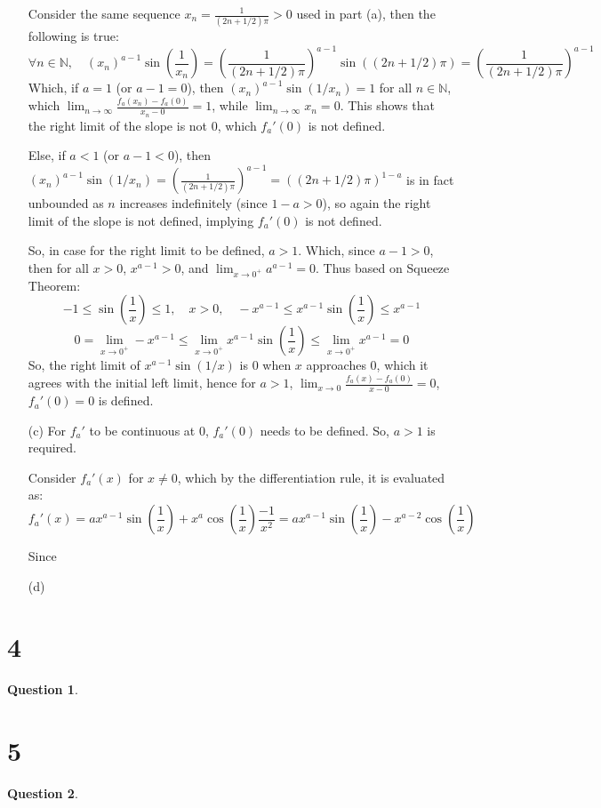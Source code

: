 \documentclass{article}
\newtheorem{question}{Question}
\begin{document}
\begin{itemize}
    Consider the same sequence $x_n = \frac{1}{(2n+1/2)\pi}>0$ used in part (a), then the following is true:
    $$\forall n\in\mathbb{N},\quad (x_n)^{a-1}\sin\left(\frac{1}{x_n}\right) = \left(\frac{1}{(2n+1/2)\pi}\right)^{a-1}\sin((2n+1/2)\pi) = \left(\frac{1}{(2n+1/2)\pi}\right)^{a-1}$$
    Which, if $a=1$ (or $a-1=0$), then $(x_n)^{a-1}\sin(1/x_n) = 1$ for all $n\in\mathbb{N}$, which $\lim_{n\rightarrow\infty}\frac{f_a(x_n)-f_a(0)}{x_n-0} = 1$, while $\lim_{n\rightarrow\infty}x_n=0$. 
    This shows that the right limit of the slope is not $0$, which $f_a'(0)$ is not defined.

    Else, if $a<1$ (or $a-1<0$), then $(x_n)^{a-1}\sin(1/x_n) = \left(\frac{1}{(2n+1/2)\pi}\right)^{a-1}= ((2n+1/2)\pi)^{1-a}$ is in fact unbounded as $n$ increases indefinitely (since $1-a>0$), 
    so again the right limit of the slope is not defined, implying $f_a'(0)$ is not defined.

    \hfill

    So, in case for the right limit to be defined, $a>1$. Which, since $a-1>0$, then for all $x>0$, $x^{a-1}>0$, and $\lim_{x\rightarrow 0^+}a^{a-1}=0$. Thus based on Squeeze Theorem:
    $$-1\leq \sin\left(\frac{1}{x}\right)\leq 1,\quad x>0,\quad -x^{a-1}\leq x^{a-1}\sin\left(\frac{1}{x}\right)\leq x^{a-1}$$
    $$0=\lim_{x\rightarrow0^+}-x^{a-1} \leq \lim_{x\rightarrow0^+}x^{a-1}\sin\left(\frac{1}{x}\right) \leq \lim_{x\rightarrow0^+}x^{a-1}=0$$
    So, the right limit of $x^{a-1}\sin(1/x)$ is $0$ when $x$ approaches $0$, which it agrees with the initial left limit,
    hence for $a>1$, $\lim_{x\rightarrow 0}\frac{f_a(x)-f_a(0)}{x-0} = 0$, $f_a'(0)=0$ is defined.

    \hfill

    \item[(c)] For $f_a'$ to be continuous at $0$, $f_a'(0)$ needs to be defined. So, $a>1$ is required.
    
    Consider $f_a'(x)$ for $x\neq 0$, which by the differentiation rule, it is evaluated as:
    $$f_a'(x)=ax^{a-1}\sin\left(\frac{1}{x}\right) + x^a\cos\left(\frac{1}{x}\right)\frac{-1}{x^2} = ax^{a-1}\sin\left(\frac{1}{x}\right) - x^{a-2}\cos\left(\frac{1}{x}\right)$$
    
    Since 
    
    \item[(d)]   
\end{itemize}

\break

\section*{4}
\begin{myBox}[]{}
    \begin{question}
        
    \end{question}
\end{myBox}

\break

\section*{5}
\begin{question}
    
\end{question}
\end{document}
